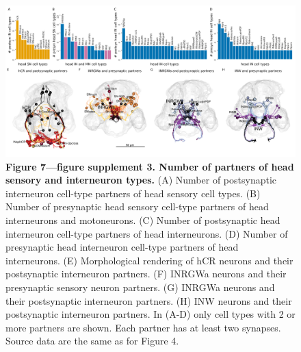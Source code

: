 \documentclass[
  11pt,
]{article}
\begin{document}
\begin{figure}[H]

{\centering \includegraphics[width=1\textwidth,height=\textheight]{Figures/Figure7_fig_suppl3.png}

}

\caption{\textbf{Figure 7---figure supplement 3. Number of partners of
head sensory and interneuron types.} (A) Number of postsynaptic
interneuron cell-type partners of head sensory cell types. (B) Number of
presynaptic head sensory cell-type partners of head interneurons and
motoneurons. (C) Number of postsynaptic head interneuron cell-type
partners of head interneurons. (D) Number of presynaptic head
interneuron cell-type partners of head interneurons. (E) Morphological
rendering of hCR neurons and their postsynaptic interneuron partners.
(F) INRGWa neurons and their presynaptic sensory neuron partners. (G)
INRGWa neurons and their postsynaptic interneuron partners. (H) INW
neurons and their postsynaptic interneuron partners. In (A-D) only cell
types with 2 or more partners are shown. Each partner has at least two
synapses. Source data are the same as for Figure 4.}

\end{figure}%
\end{document}

